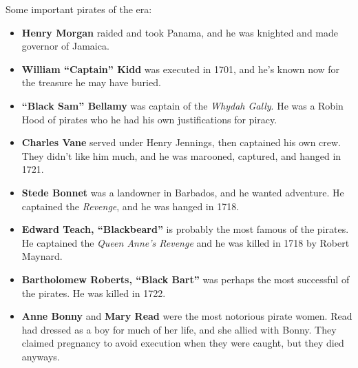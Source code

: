 Some important pirates of the era:

\begin{itemize}
  \item
    \textbf{Henry Morgan} raided and took Panama, and he was knighted and made governor of Jamaica.

  \item
    \textbf{William ``Captain'' Kidd} was executed in 1701,
    and he's known now for the treasure he may have buried.

  \item
    \textbf{``Black Sam'' Bellamy} was captain of the \textit{Whydah Gally}.
    He was a Robin Hood of pirates who he had his own justifications for piracy.

  \item
    \textbf{Charles Vane} served under Henry Jennings, then captained his own crew.
    They didn't like him much, and he was marooned, captured, and hanged in 1721.

  \item
    \textbf{Stede Bonnet} was a landowner in Barbados, and he wanted adventure.
    He captained the \textit{Revenge}, and he was hanged in 1718.

  \item
    \textbf{Edward Teach, ``Blackbeard''} is probably the most famous of the pirates.
    He captained the \textit{Queen Anne's Revenge} and he was killed in 1718 by Robert Maynard.

  \item
    \textbf{Bartholomew Roberts, ``Black Bart''} was perhaps the most successful of the pirates.
    He was killed in 1722.

  \item
    \textbf{Anne Bonny} and \textbf{Mary Read} were the most notorious pirate women.
    Read had dressed as a boy for much of her life, and she allied with Bonny.
    They claimed pregnancy to avoid execution when they were caught, but they died anyways.
\end{itemize}
